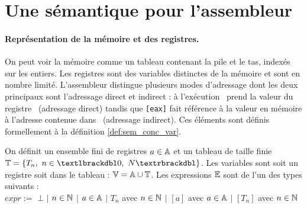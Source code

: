 \section{Une sémantique pour l'assembleur}
\paragraph{Représentation de la mémoire et des registres.}
On peut voir la mémoire comme un tableau contenant la pile et le tas, indexés sur les entiers. Les registres sont des variables distinctes de la mémoire et sont en nombre limité.
L'assembleur distingue plusieurs modes d'adressage dont les deux principaux sont l'adressage direct et indirect : à l'exécution \eax\ prend la valeur du registre \eax\ (adressage direct) tandis que \texttt{[eax]} fait référence à la valeur en mémoire à l'adresse contenue dans \eax\ (adressage indirect).
Ces éléments sont définis formellement à la définition \ref{def:sem_conc_var}.




\begin{defi}
On définit un ensemble fini de registres $a\in\mathbb A$ et un tableau de taille finie $\BT=\{T_n,\ n\in\textlbrackdbl 0,\ N\textrbrackdbl\}$. Les variables sont soit un registre soit dans le tableau : $\mathbb V=\mathbb A\cup\mathbb T$.
Les expressions $\mathbb E$ sont de l'un des types suivants :\\
$expr:=$ $\bot$ $|$ $n\in\mathbb N$ $|$ $a\in\mathbb A$ $|$ $T_n$ avec $n\in\mathbb N$ $|$ $[a]$ avec $a\in\mathbb A$ $|$ $[T_n]$ avec $n\in\mathbb N$
\label{def:sem_conc_var}
\end{defi}

